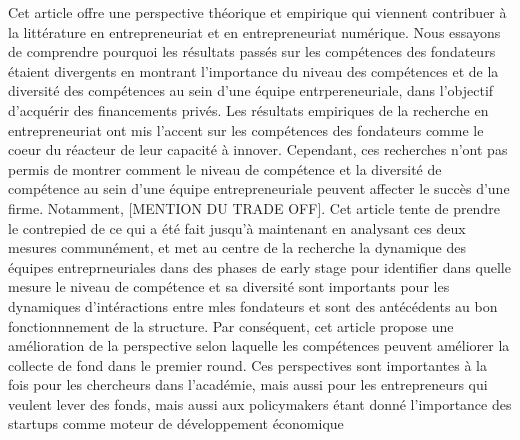 \documentclass[12pt]{article}
\begin{document}
Cet article offre une perspective théorique et empirique qui viennent contribuer à la littérature en entrepreneuriat et en entrepreneuriat numérique. Nous essayons de comprendre pourquoi les résultats passés sur les compétences des fondateurs étaient divergents en montrant l'importance du niveau des compétences et de la diversité des compétences au sein d'une équipe entrpereneuriale, dans l'objectif d'acquérir des financements privés. Les résultats empiriques de la recherche en entrepreneuriat ont mis l'accent sur les compétences des fondateurs comme le coeur du réacteur de leur capacité à innover. Cependant, ces recherches n'ont pas permis de montrer comment le niveau de compétence et la diversité de compétence au sein d'une équipe entrepreneuriale peuvent affecter le succès d'une firme. Notamment, [MENTION DU TRADE OFF]. Cet article tente de prendre le contrepied de ce qui a été fait jusqu'à maintenant en analysant ces deux mesures communément, et met au centre de la recherche la dynamique des équipes entreprneuriales dans des phases de early stage pour identifier dans quelle mesure le niveau de compétence et sa diversité sont importants pour les dynamiques d'intéractions entre mles fondateurs et sont des antécédents au bon fonctionnnement de la structure. Par conséquent, cet article propose une amélioration de la perspective selon laquelle les compétences peuvent améliorer la collecte de fond dans le premier round. Ces perspectives sont importantes à la fois pour les chercheurs dans l'académie, mais aussi pour les entrepreneurs qui veulent lever des fonds, mais aussi aux policymakers étant donné l'importance des startups comme moteur de développement économique
\end{document}
